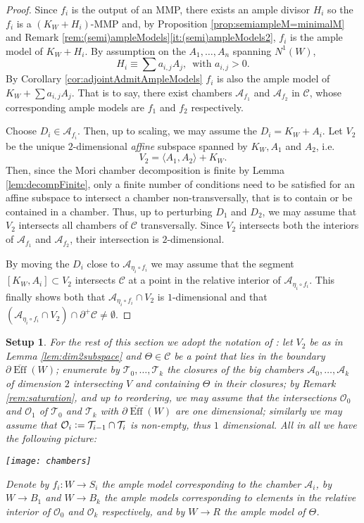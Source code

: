 \documentclass[a4paper,11pt]{amsart}
\newtheorem{setup}[theorem]{Setup}
\def\Eff{\operatorname{Eff}}
\newcommand{\OO}{\mathcal{O}}
\newcommand{\Cc}{\mathcal{C}}
\newcommand{\Aa}{\mathcal{A}}
\newcommand{\Tt}{\mathcal{T}}
\newcommand{\defeq}{\vcentcolon=}
\begin{document}
\begin{proof}
	Since $f_i$ is the output of an MMP, there exists an ample divisor $H_i$ so the $f_i$ is a $(K_W + H_i)$-MMP and, by Proposition \ref{prop:semiampleM=minimalM} and Remark \ref{rem:(semi)ampleModels}\eqref{it:(semi)ampleModels2}, $f_i$ is the ample model of $K_W + H_i$.
	By assumption on the $A_1, \dots, A_n$ spanning $N^1(W)$,
	\[
	H_i \equiv \sum a_{i,j} A_j, \, \text{ with } a_{i,j} >0.
	\]
	By Corollary \ref{cor:adjointAdmitAmpleModels} $f_i$ is also the ample model of $K_W + \sum a_{i,j} A_j$.
	That is to say, there exist chambers $\Aa_{f_1}$ and $\Aa_{f_2}$ in $\Cc$, whose corresponding ample models are $f_1$ and $f_2$ respectively.
		
	Choose $D_i \in \Aa_{f_i}$.
	Then, up to scaling, we may assume the $D_i = K_W + A_i$.
	Let $V_2$ be the unique $2$-dimensional \emph{affine} subspace spanned by $K_W, A_1$ and $A_2$, i.e.\
	\[
	V_2 = \langle A_1, A_2 \rangle + K_W.
	\] 
	Then, since the Mori chamber decomposition is finite by Lemma \ref{lem:decompFinite}, only a finite number of conditions need to be satisfied for an affine subspace to intersect a chamber non-transversally, that is to contain or be contained in a chamber.
	Thus, up to perturbing $D_1$ and $D_2$, we may assume that $V_2$ intersects all chambers of $\Cc$ transversally.
	Since $V_2$ intersects both the interiors of $\Aa_{f_1}$ and $\Aa_{f_2}$, their intersection is $2$-dimensional.
	
	By moving the $D_i$ close to $\Aa_{\eta_i\circ f_i}$ we may assume that the segment $[K_W,A_i] \subset V_2$ intersects $\Cc$ at a point in the relative interior of $\Aa_{\eta_i\circ f_i}$.
	This finally shows both that $\Aa_{\eta_i\circ f_i} \cap V_2$ is $1$-dimensional and that $\left(\Aa_{\eta_i\circ f_i} \cap V_2 \right) \cap \partial^+\Cc \neq \emptyset$. 
\end{proof}

\begin{setup}\label{set:Sarkisov}
For the rest of this section we adopt the notation of \cite[Section 3]{HM13}:
let $V_2$ be as in Lemma \ref{lem:dim2subspace} and $\Theta \in \Cc$ be a point that lies in the boundary $\partial\overline{\Eff}(W)$;
enumerate by $\Tt_0, \dots, \Tt_k$ the \emph{closures} of the big chambers $\Aa_0, \dots, \Aa_k$ of dimension $2$ intersecting $V$ and containing $\Theta$ in their closures;
by Remark \ref{rem:saturation}, and up to reordering, we may assume that the intersections $\OO_0$ and $\OO_1$ of $\Tt_0$ and $\Tt_k$ with $\partial\overline{\Eff}(W)$ are one dimensional;
similarly we may assume that $\OO_i \defeq \Tt_{i-1} \cap \Tt_i$ is non-empty, thus $1$ dimensional.
All in all we have the following picture:
\begin{center}
	\texttt{[image: chambers]}
\end{center}
Denote by $f_i \colon W \to S_i$ the ample model corresponding to the chamber $\Aa_i$,
by $W \to B_1$ and $W\to B_k$ the ample models corresponding to elements in the relative interior of $\OO_0$ and $\OO_k$ respectively, and by $W \to R$ the ample model of $\Theta$.
\end{setup}
\end{document}
